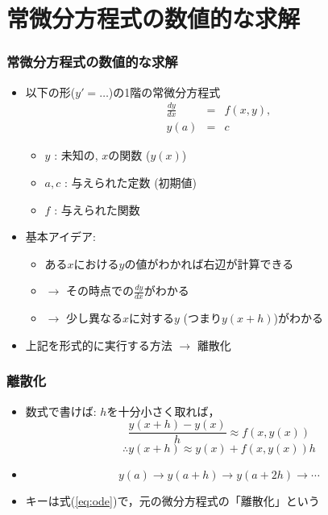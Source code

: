 \documentclass[12pt,dvipdfmx]{beamer}
\newcommand{\ao}[1]{{\color{blue}#1}}
\begin{document}
\section{常微分方程式の数値的な求解}
\begin{frame}
\frametitle{常微分方程式の数値的な求解}
\begin{itemize}
\item 以下の形($y' = \ldots$)の1階の常微分方程式
\begin{eqnarray*}
\frac{dy}{dx} & = & f(x, y), \\
y(a) & = & c
\end{eqnarray*}
\begin{itemize}
\item $y$ : 未知の, $x$の関数 ($y(x)$)
\item $a, c$ : 与えられた定数 (初期値)
\item $f$ : 与えられた関数
\end{itemize}

\item<2-> 基本アイデア:
  \begin{itemize}
  \item ある$x$における$y$の値がわかれば右辺が計算できる
  \item $\rightarrow$ その時点での$\frac{dy}{dx}$がわかる
  \item $\rightarrow$ 少し異なる$x$に対する$y$ (つまり$y(x + h)$)がわかる
  \end{itemize}

\item<3-> 上記を形式的に実行する方法 $\rightarrow$ \ao{離散化}
  
\end{itemize}
\end{frame}

\begin{frame}
\frametitle{離散化}
\begin{itemize}
\item 数式で書けば: $h$を十分小さく取れば，
\begin{equation}
\frac{y(x + h) - y(x)}{h} \approx f(x, y(x)) \label{eq:ode}
\end{equation}
\[ \therefore y(x+h) \approx y(x) + f(x, y(x)) h \]

\item []
\[ y(a) \rightarrow y(a+h) \rightarrow y(a+2h) \rightarrow \cdots \]

\item キーは式(\ref{eq:ode})で，元の微分方程式の\ao{「離散化」}という
\end{itemize}
\end{frame}
\end{document}
